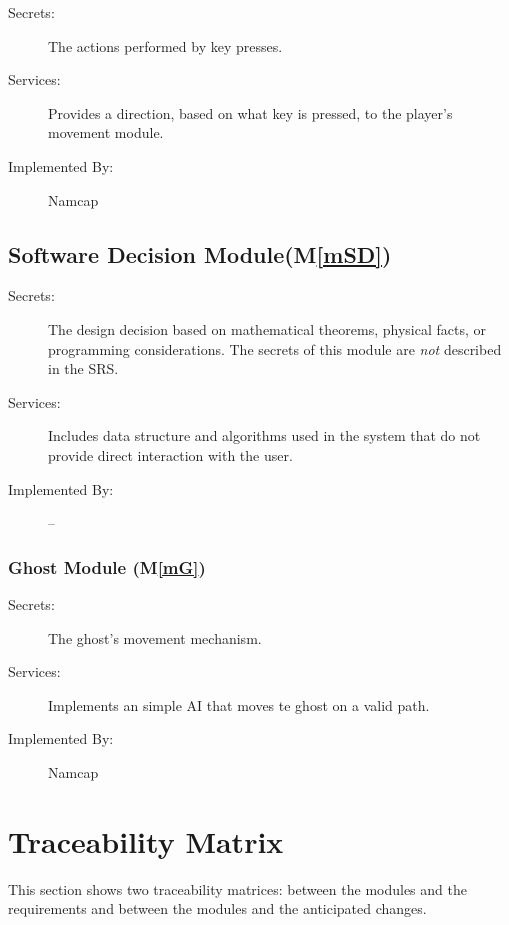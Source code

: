 \documentclass[12pt, titlepage]{article}
\newcommand{\mref}[1]{M\ref{#1}}
\begin{document}
\begin{description}
\item[Secrets:]The actions performed by key presses.
\item[Services:]Provides a direction, based on what key is pressed, to the player's movement module.
\item[Implemented By:] Namcap
\end{description}


\subsection{Software Decision Module(\mref{mSD})}

\begin{description}
\item[Secrets:] The design decision based on mathematical theorems, physical
  facts, or programming considerations. The secrets of this module are
  \emph{not} described in the SRS.
\item[Services:] Includes data structure and algorithms used in the system that
  do not provide direct interaction with the user. 
\item[Implemented By:] --
\end{description}

\subsubsection{Ghost Module (\mref{mG})}

\begin{description}
\item[Secrets:]The ghost's movement mechanism.
\item[Services:]Implements an simple AI that moves te ghost on a valid path.
\item[Implemented By:] Namcap
\end{description}


\section{Traceability Matrix} \label{SecTM}

This section shows two traceability matrices: between the modules and the
requirements and between the modules and the anticipated changes.
\end{document}
